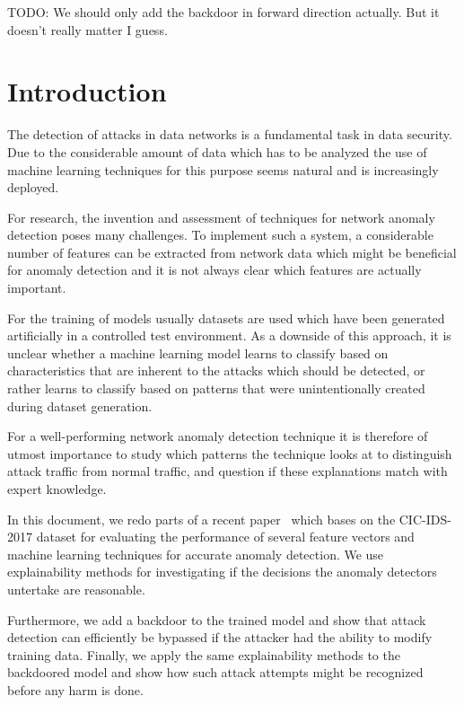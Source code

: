 \documentclass[10pt,sigconf,letterpaper]{acmart}
\newcommand\note[2]{{\color{#1}#2}}
\newcommand\todo[1]{{\note{red}{TODO: #1}}}
\begin{document}
\maketitle

\todo{We should only add the backdoor in forward direction actually. But it doesn't really matter I guess.}

\section{Introduction}
The detection of attacks in data networks is a fundamental task in data security. Due to the considerable amount of data which has to be analyzed the use of machine learning techniques for this purpose seems natural and is increasingly deployed.

For research, the invention and assessment of techniques for network anomaly detection poses many challenges. To implement such a system, a considerable number of features can be extracted from network data which might be beneficial for anomaly detection and it is not always clear which features are actually important. 

For the training of models usually datasets are used which have been generated artificially in a controlled test environment. As a downside of this approach, it is unclear whether a machine learning model learns to classify based on characteristics that are inherent to the attacks which should be detected, or rather learns to classify based on patterns that were unintentionally created during dataset generation.

For a well-performing network anomaly detection technique it is therefore of utmost importance to study which patterns the technique looks at to distinguish attack traffic from normal traffic, and question if these explanations match with expert knowledge.

In this document, we redo parts of a recent paper~\cite{fares} which bases on the CIC-IDS-2017 dataset \cite{Sharafaldin2018} for evaluating the performance of several feature vectors and machine learning techniques for accurate anomaly detection. We use explainability methods for investigating if the decisions the anomaly detectors untertake are reasonable.

Furthermore, we add a backdoor to the trained model and show that attack detection can efficiently be bypassed if the attacker had the ability to modify training data. Finally, we apply the same explainability methods to the backdoored model and show how such attack attempts might be recognized before any harm is done.
\end{document}
